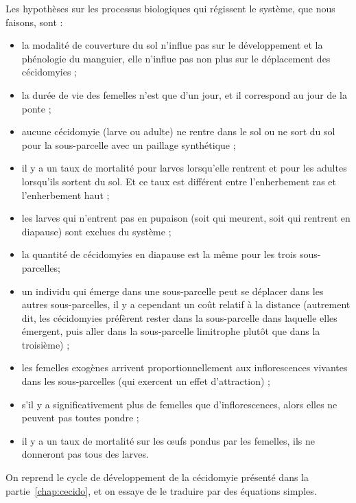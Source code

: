 Les hypothèses sur les processus biologiques qui régissent le système, que nous faisons, sont :
\begin{itemize}
 \item la modalité de couverture du sol n'influe pas sur le développement et la phénologie du manguier, elle n'influe pas non plus sur le déplacement des cécidomyies ;
 \item la durée de vie des femelles n'est que d'un jour, et il correspond au jour de la ponte ;
 \item aucune cécidomyie (larve ou adulte) ne rentre dans le sol ou ne sort du sol pour la sous-parcelle avec un paillage synthétique ;
 \item il y a un taux de mortalité pour larves lorsqu'elle rentrent et pour les adultes lorsqu'ils sortent du sol. Et ce taux est différent entre l'enherbement ras et l'enherbement haut ;
 \item les larves qui n'entrent pas en pupaison (soit qui meurent, soit qui rentrent en diapause) sont exclues du système ;
 \item la quantité de cécidomyies en diapause est la même pour les trois sous-parcelles;
 \item un individu qui émerge dans une sous-parcelle peut se déplacer dans les autres sous-parcelles, il y a cependant un coût relatif à la distance (autrement dit, les cécidomyies préfèrent rester dans la sous-parcelle dans laquelle elles émergent, puis aller dans la sous-parcelle limitrophe plutôt que dans la troisième) ;
 \item les femelles exogènes arrivent proportionnellement aux inflorescences vivantes dans les sous-parcelles (qui exercent un effet d'attraction) ;
 \item s’il y a significativement plus de femelles que d’inflorescences, alors elles ne peuvent pas toutes pondre ;  
 \item il y a un taux de mortalité sur les œufs pondus par les femelles, ils ne donneront pas tous des larves.
\end{itemize}

On reprend le cycle de développement de la cécidomyie présenté dans la partie~\ref{chap:cecido}, et on essaye de le traduire par des équations simples.

